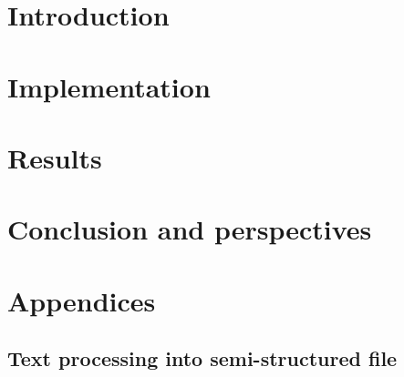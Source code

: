 \documentclass[]{report}
\title{\reportTitle}
\author{\reportAuthor}
\begin{document}
\maketitle



\tableofcontents

\chapter{Introduction}

\chapter{Implementation}

\chapter{Results}
\chapter{Conclusion and perspectives}




\appendix
\chapter*{Appendices}
\renewcommand{\thesection}{\Alph{section}}


\section{Text processing into semi-structured file}
\end{document}
